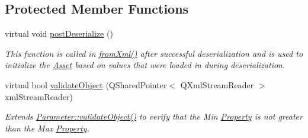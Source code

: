\subsection*{Protected Member Functions}
\begin{DoxyCompactItemize}
\item 
virtual void \hyperlink{class_picto_1_1_pseudorandom_int_parameter_a21f8619871a924acf5539535f4ebfc5a}{post\-Deserialize} ()
\begin{DoxyCompactList}\small\item\em This function is called in \hyperlink{class_picto_1_1_asset_a8bed4da09ecb1c07ce0dab313a9aba67}{from\-Xml()} after successful deserialization and is used to initialize the \hyperlink{class_picto_1_1_asset}{Asset} based on values that were loaded in during deserialization. \end{DoxyCompactList}\item 
\hypertarget{class_picto_1_1_pseudorandom_int_parameter_a9d9a900f07829737adc2f29cb1169f30}{virtual bool \hyperlink{class_picto_1_1_pseudorandom_int_parameter_a9d9a900f07829737adc2f29cb1169f30}{validate\-Object} (Q\-Shared\-Pointer$<$ Q\-Xml\-Stream\-Reader $>$ xml\-Stream\-Reader)}\label{class_picto_1_1_pseudorandom_int_parameter_a9d9a900f07829737adc2f29cb1169f30}

\begin{DoxyCompactList}\small\item\em Extends \hyperlink{class_picto_1_1_parameter_a94c0e4191ffcc0bd642b647d24557082}{Parameter\-::validate\-Object()} to verify that the Min \hyperlink{class_picto_1_1_property}{Property} is not greater than the Max \hyperlink{class_picto_1_1_property}{Property}. \end{DoxyCompactList}\end{DoxyCompactItemize}
